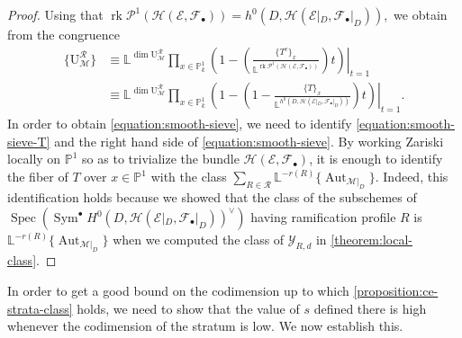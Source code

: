 \documentclass[12 pt]{amsart}
\theoremstyle{plain}
\theoremstyle{definition}
\theoremstyle{remark}
\numberwithin{equation}{section}
\newcommand\bl{\mathbb L}
\newcommand\bp{\mathbb P}
\newcommand\sce{\mathscr E}
\newcommand\scf{\mathscr F}
\newcommand\sch{\mathscr H}
\newcommand\scy{\mathscr Y}
\DeclareMathOperator\spec{\operatorname{Spec}}
\newcommand\ce{\mathscr M} %
\newcommand\ramlocus[2]{\mathrm{U}_{#1}^{#2}} %
\newcommand\ressections[2]{\scy_{#1,#2}} %
\DeclareMathOperator\rk{rk}
\DeclareMathOperator\sym{Sym}
\DeclareMathOperator\aut{Aut}
\begin{document}
\begin{proof}
	Using that $\rk \mathcal P^1( \sch(\sce,\scf_\bullet))=
	h^0(D, \sch(\sce|_D,\scf_\bullet|_D)),$
	we obtain from \cite[Thm.\
	9.3.1]{biluH:motivic-euler-products-in-motivic-statistics} the congruence 
	\begin{align} \{\ramlocus \ce {\mathcal R}\}
		&\equiv \bl^{\dim \ramlocus \ce {\mathcal R}} \prod_{x \in
		\bp^1_k} \left. \left( 1- \left( \frac{ \{T^c\}_x
					}{\bl^{\rk \mathcal P^1( \sch(\sce,
			\scf_\bullet))}}  \right) t \right)
					\right\rvert_{t =1} \\
					&
					\label{equation:smooth-sieve-T}\equiv
		\bl^{\dim \ramlocus \ce {\mathcal R}} \prod_{x \in
		\bp^1_k} \left. \left( 1- \left( 1 - \frac{ \{T\}_x
					}{\bl^{h^0(D, \sch(\sce|_D,
					\scf_\bullet|_D))}} \right) t \right)
				\right\rvert_{t =1}. \end{align} 
	In order to obtain
	\eqref{equation:smooth-sieve}, we need to identify 
	\eqref{equation:smooth-sieve-T} and the right hand side of \eqref{equation:smooth-sieve}.
	By working Zariski locally on $\mathbb P^1$ so as to trivialize the
	bundle $\sch(\sce, \scf_\bullet)$,
	it is enough to identify the fiber of $T$ over $x \in \mathbb P^1$ with the class
	$\sum_{R \in \mathcal R} \bl^{-r(R)} \{\aut_{\ce|_D}\}$.
	Indeed, this identification holds because we showed that the class of the subschemes of
	$\spec \left( \sym^\bullet H^0(D, \sch(\sce|_D,
	\scf_\bullet|_D))^\vee \right)$
	having ramification profile
	$R$ is $\bl^{-r(R)} \{\aut_{\ce|_D}\}$ when we computed the class of
$\ressections R d$ in \autoref{theorem:local-class}.  \end{proof}

In order to get a good bound on the codimension up to which
\autoref{proposition:ce-strata-class} holds,
we need to show that the value of $s$ defined there is high whenever
the codimension of the stratum is low.
We now establish this.
\end{document}
